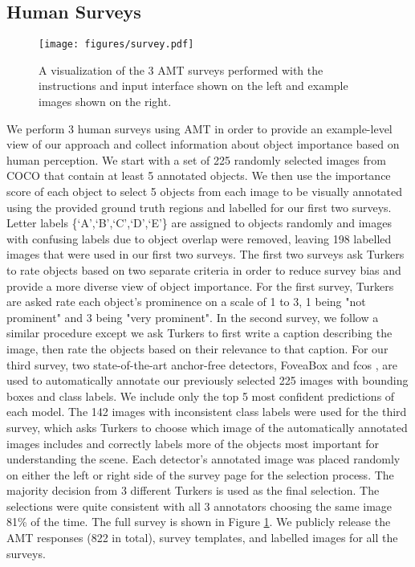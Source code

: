 \documentclass[10pt,twocolumn,letterpaper]{article}
\begin{document}
\subsection{Human Surveys}
\begin{figure}[t!]
\centering
\def\svgwidth{\columnwidth}
\texttt{[image: figures/survey.pdf]}
\caption{A visualization of the 3 AMT surveys performed with the instructions and input interface shown on the left and example images shown on the right.}
\label{survey}
\end{figure}
We perform 3 human surveys using AMT in order to provide an example-level view of our approach and collect information about object importance based on human perception. We start with a set of 225 randomly selected images from COCO that contain at least 5 annotated objects. We then use the importance score of each object to select 5 objects from each image to be visually annotated using the provided ground truth regions and labelled for our first two surveys. Letter labels \{`A',`B',`C',`D',`E'\} are assigned to objects randomly and images with confusing labels due to object overlap were removed, leaving 198 labelled images that were used in our first two surveys. The first two surveys ask Turkers to rate objects based on two separate criteria in order to reduce survey bias and provide a more diverse view of object importance. For the first survey, Turkers are asked rate each object's prominence on a scale of 1 to 3, 1 being "not prominent" and 3 being "very prominent". In the second survey, we follow a similar procedure except we ask Turkers to first write a caption describing the image, then rate the objects based on their relevance to that caption. For our third survey, two state-of-the-art anchor-free detectors, FoveaBox \cite{fovea2020} and fcos \cite{fcos2019}, are used to automatically annotate our previously selected 225 images with bounding boxes and class labels. We include only the top 5 most confident predictions of each model. The 142 images with inconsistent class labels were used for the third survey, which asks Turkers to choose which image of the automatically annotated images includes and correctly labels more of the objects most important for understanding the scene. Each detector's annotated image was placed randomly on either the left or right side of the survey page for the selection process. The majority decision from 3 different Turkers is used as the final selection. The selections were quite consistent with all 3 annotators choosing the same image 81\% of the time. The full survey is shown in Figure \ref{survey}. We publicly release the AMT responses (822 in total), survey templates, and labelled images for all the surveys.
\end{document}
